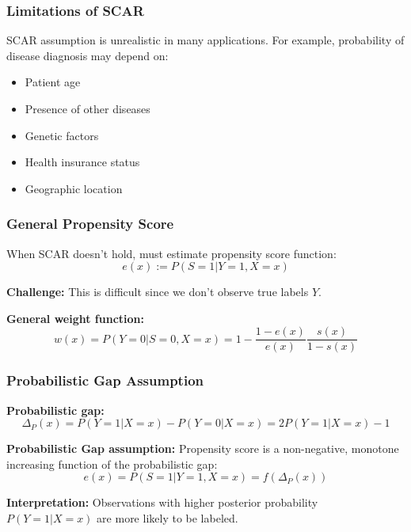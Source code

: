 \documentclass[12pt,a4paper]{article}
\begin{document}
\subsubsection{Limitations of SCAR}

SCAR assumption is unrealistic in many applications. For example, probability of disease diagnosis may depend on:
\begin{itemize}
    \item Patient age
    \item Presence of other diseases  
    \item Genetic factors
    \item Health insurance status
    \item Geographic location
\end{itemize}

\subsubsection{General Propensity Score}

When SCAR doesn't hold, must estimate propensity score function:
\begin{equation}
e(x) := P(S = 1|Y = 1, X = x)
\end{equation}

\textbf{Challenge:} This is difficult since we don't observe true labels $Y$.

\textbf{General weight function:}
\begin{equation}
w(x) = P(Y = 0|S = 0, X = x) = 1 - \frac{1-e(x)}{e(x)} \frac{s(x)}{1-s(x)}
\end{equation}

\subsubsection{Probabilistic Gap Assumption}

\textbf{Probabilistic gap:}
\begin{equation}
\Delta_P(x) = P(Y = 1|X = x) - P(Y = 0|X = x) = 2P(Y = 1|X = x) - 1
\end{equation}

\textbf{Probabilistic Gap assumption:} Propensity score is a non-negative, monotone increasing function of the probabilistic gap:
\begin{equation}
e(x) = P(S = 1|Y = 1, X = x) = f(\Delta_P(x))
\end{equation}

\textbf{Interpretation:} Observations with higher posterior probability $P(Y = 1|X = x)$ are more likely to be labeled.
\end{document}
